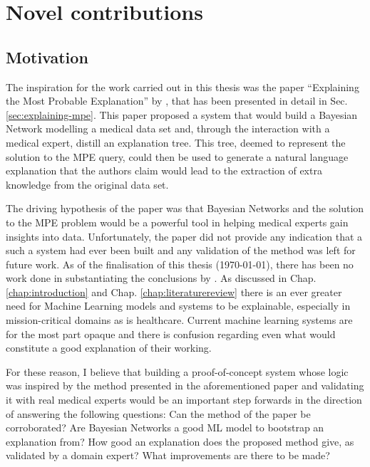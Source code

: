 \section{Novel contributions}\label{sec:novel-contributions}
 \subsection{Motivation} 
 The inspiration for the work carried out in this thesis was the paper \enquote{Explaining the Most Probable Explanation} by \cite{Butz2018}, that has been presented in detail in Sec. \ref{sec:explaining-mpe}.
 This paper proposed a system that would build a Bayesian Network modelling a medical data set and, through the interaction with a medical expert, distill an explanation tree.
 This tree, deemed to represent the solution to the MPE query, could then be used to generate a natural language explanation that the authors claim would lead to the extraction of extra knowledge from the original data set.  

 The driving hypothesis of the paper was that Bayesian Networks and the solution to the MPE problem would be a powerful tool in helping medical experts gain insights into data.
 Unfortunately, the paper did not provide any indication that a such a system had ever been built and any validation of the method was left for future work.
 As of the finalisation of this thesis (\today), there has been no work done in substantiating the conclusions by \cite{Butz2018}. 
 As discussed in Chap. \ref{chap:introduction} and Chap. \ref{chap:literaturereview} there is an ever greater need for Machine Learning models and systems to be explainable, especially in mission-critical domains as is healthcare.
 Current machine learning systems are for the most part opaque and there is confusion regarding even what would constitute a good explanation of their working.
 
 For these reason, I believe that building a proof-of-concept system whose logic was inspired by the method presented in the aforementioned paper and validating it with real medical experts would be an important step forwards in the direction of answering the following questions:
 Can the method of the paper be corroborated?
 Are Bayesian Networks a good ML model to bootstrap an explanation from?
 How good an explanation does the proposed method give, as validated by a domain expert?
 What improvements are there to be made?

